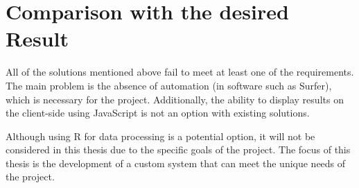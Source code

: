 \section{Comparison with the desired Result}

All of the solutions mentioned above fail to meet at least one of the
requirements. The main problem is the absence of automation (in software such as
Surfer), which is necessary for the project. Additionally, the ability to
display results on the client-side using JavaScript is not an option with
existing solutions.

Although using R for data processing is a potential option, it will not be
considered in this thesis due to the specific goals of the project. The focus
of this thesis is the development of a custom system that can meet the unique
needs of the project.